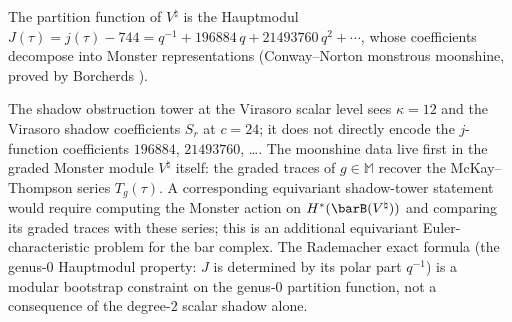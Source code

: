 \begin{remark}%
\label{rem:moonshine-j-function}%
%
%
The partition function of $V^\natural$ is the Hauptmodul
$J(\tau) = j(\tau) - 744 = q^{-1} + 196884\,q
+ 21493760\,q^2 + \cdots$,
whose coefficients decompose into Monster representations
(Conway--Norton monstrous moonshine, proved by
Borcherds \cite{Bor92}).

The shadow obstruction tower at the Virasoro scalar level sees
$\kappa = 12$ and the Virasoro shadow coefficients
$S_r$ at $c = 24$; it does not directly encode the
$j$-function coefficients $196884$, $21493760$, \ldots.
The moonshine data live first in the graded Monster module
$V^\natural$ itself: the graded traces of $g \in \mathbb{M}$
recover the McKay--Thompson series $T_g(\tau)$. A corresponding
equivariant shadow-tower statement would require computing the
Monster action on $H^*(\barB(V^\natural))$ and comparing its graded
traces with these series; this is an additional equivariant
Euler-characteristic problem for the bar complex.
The Rademacher exact formula (the genus-$0$ Hauptmodul
property: $J$ is determined by its polar part $q^{-1}$)
is a modular bootstrap constraint on the genus-$0$ partition function,
not a consequence of the degree-$2$ scalar shadow alone.
\end{remark}

